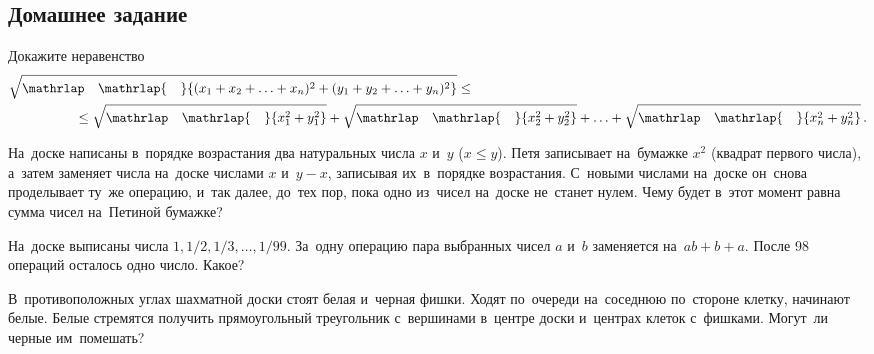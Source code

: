 

\subsection*{Домашнее задание}



\begin{problems}

\item
Докажите неравенство
\begingroup
\let\oldsqrt\sqrt
\renewcommand\sqrt[1]{\oldsqrt{\mathrlap{\phantom{x_1^2}}{#1}}}
\begin{align*}
    \hspace{5em}&\hspace{-5em}
    \sqrt{
        (x_1 + x_2 + \ldots + x_n)^2 +
        (y_1 + y_2 + \ldots + y_n)^2
    }
\leq\\&{}\leq
    \sqrt{x_1^2 + y_1^2} + \sqrt{x_2^2 + y_2^2}
    + \ldots +
    \sqrt{x_n^2 + y_n^2}
\, . \end{align*}
\endgroup

\item
На~доске написаны в~порядке возрастания два натуральных числа $x$ и~$y$
($x \leq y$).
Петя записывает на~бумажке $x^2$ (квадрат первого числа), а~затем заменяет
числа на~доске числами $x$ и~$y - x$, записывая их~в~порядке возрастания.
С~новыми числами на~доске он~снова проделывает ту~же операцию, и~так далее,
до~тех пор, пока одно из~чисел на~доске не~станет нулем.
Чему будет в~этот момент равна сумма чисел на~Петиной бумажке?

\item
На~доске выписаны числа $1, 1/2, 1/3, \ldots, 1/99$.
За~одну операцию пара выбранных чисел $a$ и~$b$ заменяется на~$a b + b + a$.
После 98 операций осталось одно число.
Какое?

\item
В~противоположных углах шахматной доски стоят белая и~черная фишки.
Ходят по~очереди на~соседнюю по~стороне клетку, начинают белые.
Белые стремятся получить прямоугольный треугольник с~вершинами в~центре доски
и~центрах клеток с~фишками.
Могут~ли черные им~помешать?

\end{problems}

